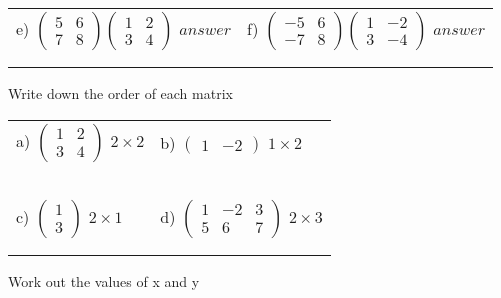 \documentclass[fontsize=12pt]{scrartcl}
\begin{document}
\begin{tabular}{p{9cm}p{9cm}}
e) $\begin{pmatrix}5&6\\7&8 \end{pmatrix} \begin{pmatrix}1&2\\3&4 \end{pmatrix}$
 \quad $answer$
&f) $\begin{pmatrix}-5&6\\-7&8 \end{pmatrix} \begin{pmatrix}1&-2\\3&-4 \end{pmatrix}$
 \quad $answer$
\\\\\\
\end{tabular}
\newpage
Write down the order of each matrix
\newline
\newline
\begin{tabular}{p{9cm}p{9cm}}
a) $\begin{pmatrix}1&2\\3&4 \end{pmatrix}$
 \quad $2\times 2$
&b) $\begin{pmatrix}1&-2 \end{pmatrix}$
 \quad $1\times 2$
\\\\\\
\\\\\\

c) $\begin{pmatrix}1\\3 \end{pmatrix}$
 \quad $2\times 1$
&d) $\begin{pmatrix}1&-2&3\\5&6&7 \end{pmatrix}$
 \quad $2\times 3$
\\\\\\
\end{tabular}
\newpage
Work out the values of x and y
\newline
\newline
\end{document}
